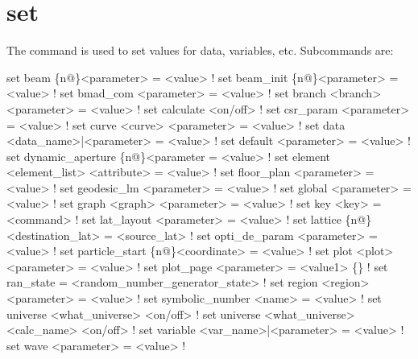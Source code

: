 {{\section{set}
\label{s:set}

The  command is used to set values for data, variables, etc. Subcommands are:
\begin{example}
  set beam \{n@\}<parameter> = <value>                        ! 
  set beam_init \{n@\}<parameter> = <value>                   ! 
  set bmad_com <parameter> = <value>                        ! 
  set branch <branch> <parameter> = <value>                 ! 
  set calculate <on/off>                                    ! 
  set csr_param <parameter> = <value>                       ! 
  set curve <curve> <parameter> = <value>                   ! 
  set data <data_name>|<parameter> = <value>                ! 
  set default <parameter> = <value>                         ! 
  set dynamic_aperture \{n@\}<parameter = <value>             ! 
  set element <element_list> <attribute> = <value>          ! 
  set floor_plan <parameter> = <value>                      ! 
  set geodesic_lm <parameter> = <value>                     ! 
  set global <parameter> = <value>                          ! 
  set graph <graph> <parameter> = <value>                   ! 
  set key <key> = <command>                                 ! 
  set lat_layout <parameter> = <value>                      ! 
  set lattice \{n@\}<destination_lat> = <source_lat>          ! 
  set opti_de_param <parameter> = <value>                   ! 
  set particle_start \{n@\}<coordinate> = <value>             ! 
  set plot <plot> <parameter> = <value>                     ! 
  set plot_page <parameter> = <value1> \{<value2>\}           ! 
  set ran_state = <random_number_generator_state>           ! 
  set region <region> <parameter> = <value>                 ! 
  set symbolic_number <name> = <value>                      ! 
  set universe <what_universe> <on/off>                     ! 
  set universe <what_universe> <calc_name> <on/off>         ! 
  set variable <var_name>|<parameter> = <value>             ! 
  set wave <parameter> = <value>                            ! 
\end{example}

}}
